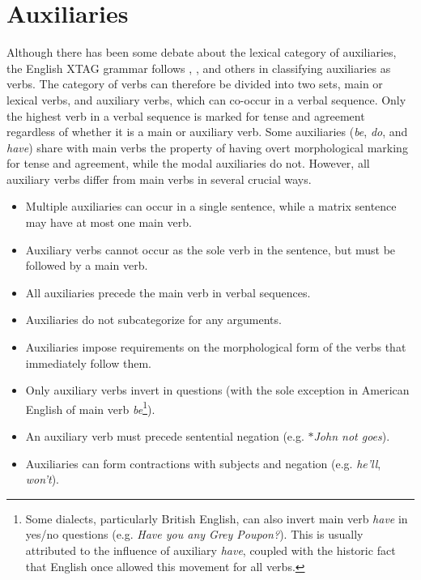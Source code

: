 \chapter{Auxiliaries}
\label{auxiliaries}

Although there has been some debate about the lexical category of auxiliaries,
the English XTAG grammar follows \cite{mccawley88}, \cite{haegeman91}, and
others in classifying auxiliaries as verbs. The category of verbs can therefore
be divided into two sets, main or lexical verbs, and auxiliary verbs, which can
co-occur in a verbal sequence.  Only the highest verb in a verbal sequence is
marked for tense and agreement regardless of whether it is a main or auxiliary
verb.  Some auxiliaries ({\it be}, {\it do}, and {\it have}) share with main
verbs the property of having overt morphological marking for tense and
agreement, while the modal auxiliaries do not.  However, all auxiliary verbs
differ from main verbs in several crucial ways.

\begin{itemize}

\item Multiple auxiliaries can occur in a single sentence, while a matrix
sentence may have at most one main verb. 

\item Auxiliary verbs cannot occur as the sole verb in the sentence, but must
be followed by a main verb.

\item All auxiliaries precede the main verb in verbal sequences.

\item Auxiliaries do not subcategorize for any arguments.

\item Auxiliaries impose requirements on the morphological form of the verbs
that immediately follow them.

\item Only auxiliary verbs invert in questions (with the sole exception in 
American English of main verb {\it be}\footnote{Some dialects, particularly
British English, can also invert main verb {\it have} in yes/no questions
(e.g. {\it Have you any Grey Poupon?}).  This is usually attributed to the
influence of auxiliary {\it have}, coupled with the historic fact that English
once allowed this movement for all verbs.\label{have-footnote}}).

\item An auxiliary verb must precede sentential negation (e.g. $\ast${\it John not goes}).

\item Auxiliaries can form contractions with subjects and negation (e.g. {\it
he'll}, {\it won't}).

\end{itemize}



